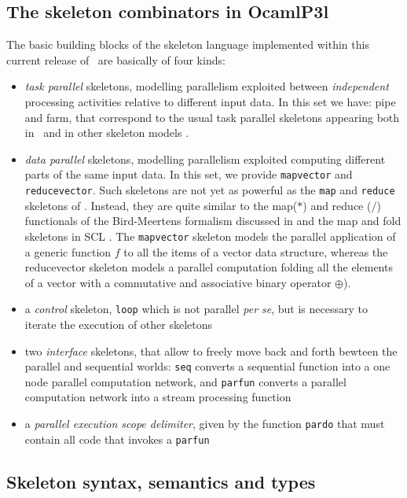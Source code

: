 \subsection{The skeleton combinators in OcamlP3l}
The basic building blocks of the skeleton language 
implemented within this current release of \ocamlpiiil\ are basically of four kinds:
\begin{itemize}
\item \textit{task parallel} skeletons, modelling parallelism
  exploited between \textit{independent} processing activities
  relative to different input data. In this set we have: pipe
  and farm, that correspond to
  the usual task parallel skeletons appearing both in \pppl\ 
  and in other skeleton models
  \cite{cole-th,ic-parle-93-1, darli-to-1}.
\item \textit{data parallel} skeletons, modelling parallelism exploited
  computing different parts of the same input
  data. In this set, we provide \verb|mapvector| and
  \verb|reducevector|. 
  Such skeletons are not yet as powerful as the
  \verb|map| and \verb|reduce| skeletons of \pppl. Instead, they are quite similar to
  the map($*$) and reduce ($/$) functionals of the Bird-Meertens formalism
  discussed in \cite{bird1} and the \textsf{map} and \textsf{fold} skeletons in SCL
\cite{darli-to-1}. The \texttt{mapvector} skeleton models the parallel application of
a generic function $f$ to all the items of a vector data structure,
whereas the reducevector skeleton models a parallel computation folding all
the elements of a vector with a commutative and associative binary
operator $\oplus$). 
\item a \textit{control} skeleton, \verb|loop| which is not parallel \textit{per se},
      but is necessary to iterate the execution of other skeletons 

\item two \textit{interface} skeletons, that allow to freely move back and forth
      bewteen the parallel and sequential worlds: \verb|seq| converts a sequential
      function into a one node parallel computation network,
      and \verb|parfun| converts a parallel computation network into a
      stream processing function

\item a \textit{parallel execution scope delimiter}, given by the function \verb|pardo| that
      must contain all code that invokes a \verb|parfun| 
\end{itemize}

\subsection{Skeleton syntax, semantics and types}

